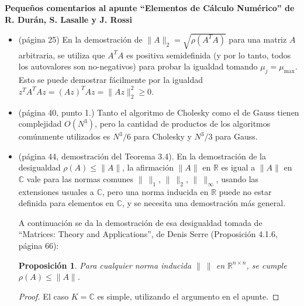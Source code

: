 \documentclass[12pt]{article}
\def\C{\mathbb{C}}
\def \R{\mathbb{R}}
\begin{document}
\newtheorem{theorem}{Theorem}
\newtheorem{prop}[theorem]{Proposici\'on}

\vskip 0.2cm

\date{\today}

 \vskip 0.2cm

\noindent
 {\bf Peque\~nos comentarios al apunte ``Elementos de C\'alculo Num\'erico'' de R. Dur\'an, S. Lasalle y J. Rossi}

 \makeatletter


\vskip 0.2cm

 \bigskip
 \centerline{\ttfamily \@date}
 \bigskip


\begin{itemize}

\item (p\'agina 25) En la demostraci\'on de $\|A\|_2 = \sqrt{\rho(A^TA)}$ para una matriz $A$ arbitraria, se utiliza que $A^TA$ es positiva semidefinida (y por lo tanto, todos los autovalores son no-negativos) para probar la igualdad tomando $\mu_j = \mu_{\max}$.
Esto se puede demostrar f\'acilmente por la igualdad $z^T A^T A z = (Az)^T Az = \|Az\|_2^2 \ge 0$.

\item (p\'agina 40, punto 1.) Tanto el algoritmo de Cholesky como el de Gauss tienen complejidad $O(N^3)$, pero la cantidad de productos de los algoritmos com\'unmente utilizados es $N^3/6$ para Cholesky y $N^3/3$ para Gauss. 

\item (p\'agina 44, demostraci\'on del Teorema 3.4). En la demostraci\'on de la desigualdad $\rho(A) \le \|A\|$, la afirmaci\'on $\|A\|$ en $\R$ es igual a $\|A\|$ en $\C$ vale para las normas comunes $\|\ \|_1$, $\|\ \|_2$, $\|\ \|_\infty$, usando las extensiones usuales a $\C$, pero una norma inducida en $\R$ puede no estar definida para elementos en $\C$, y se necesita una demostraci\'on m\'as general.

A continuaci\'on se da la demostraci\'on de esa desigualdad tomada de ``Matrices: Theory and Applications'', de Denis Serre (Proposici\'on 4.1.6, p\'agina 66):

\begin{prop}
 Para cualquier norma inducida $\|\ \|$ en $\R^{n\times n}$, se cumple $\rho(A) \le \|A\|$.
\end{prop}
\begin{proof}
 El caso $K = \C$ es simple, utilizando el argumento en el apunte.


\end{proof}
\end{itemize}
\end{document}
